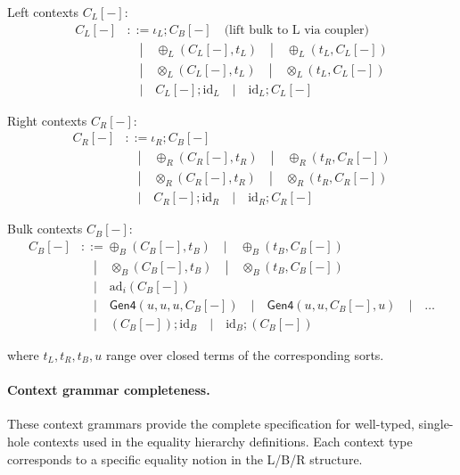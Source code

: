 \begin{definition}
\label{def:context-grammars}
Left contexts $C_L[-]$:
\begin{align}
C_L[-] &::= \iota_L ; C_B[-] \quad \text{(lift bulk to L via coupler)} \\
&\quad | \quad \oplus_L(C_L[-], t_L) \quad | \quad \oplus_L(t_L, C_L[-]) \\
&\quad | \quad \otimes_L(C_L[-], t_L) \quad | \quad \otimes_L(t_L, C_L[-]) \\
&\quad | \quad C_L[-] ; \text{id}_L \quad | \quad \text{id}_L ; C_L[-]
\end{align}

Right contexts $C_R[-]$:
\begin{align}
C_R[-] &::= \iota_R ; C_B[-] \\
&\quad | \quad \oplus_R(C_R[-], t_R) \quad | \quad \oplus_R(t_R, C_R[-]) \\
&\quad | \quad \otimes_R(C_R[-], t_R) \quad | \quad \otimes_R(t_R, C_R[-]) \\
&\quad | \quad C_R[-] ; \text{id}_R \quad | \quad \text{id}_R ; C_R[-]
\end{align}

Bulk contexts $C_B[-]$:
\begin{align}
C_B[-] &::= \oplus_B(C_B[-], t_B) \quad | \quad \oplus_B(t_B, C_B[-]) \\
&\quad | \quad \otimes_B(C_B[-], t_B) \quad | \quad \otimes_B(t_B, C_B[-]) \\
&\quad | \quad \text{ad}_i(C_B[-]) \\
&\quad | \quad \mathsf{Gen4}(u, u, u, C_B[-]) \quad | \quad \mathsf{Gen4}(u, u, C_B[-], u) \quad | \quad \ldots \\
&\quad | \quad (C_B[-]) ; \text{id}_B \quad | \quad \text{id}_B ; (C_B[-])
\end{align}

where $t_L, t_R, t_B, u$ range over closed terms of the corresponding sorts.
\end{definition}

\paragraph{Context grammar completeness.} These context grammars provide the complete specification for well-typed, single-hole contexts used in the equality hierarchy definitions. Each context type corresponds to a specific equality notion in the L/B/R structure.

